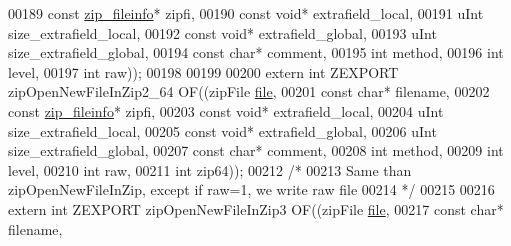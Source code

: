 \begin{DoxyCode}
00189                                             \textcolor{keyword}{const} \hyperlink{structzip__fileinfo}{zip\_fileinfo}* zipfi,
00190                                             \textcolor{keyword}{const} \textcolor{keywordtype}{void}* extrafield\_local,
00191                                             uInt size\_extrafield\_local,
00192                                             \textcolor{keyword}{const} \textcolor{keywordtype}{void}* extrafield\_global,
00193                                             uInt size\_extrafield\_global,
00194                                             \textcolor{keyword}{const} \textcolor{keywordtype}{char}* comment,
00195                                             \textcolor{keywordtype}{int} method,
00196                                             \textcolor{keywordtype}{int} level,
00197                                             \textcolor{keywordtype}{int} raw));
00198 
00199 
00200 \textcolor{keyword}{extern} \textcolor{keywordtype}{int} ZEXPORT zipOpenNewFileInZip2\_64 OF((zipFile \hyperlink{structfile}{file},
00201                                             \textcolor{keyword}{const} \textcolor{keywordtype}{char}* filename,
00202                                             \textcolor{keyword}{const} \hyperlink{structzip__fileinfo}{zip\_fileinfo}* zipfi,
00203                                             \textcolor{keyword}{const} \textcolor{keywordtype}{void}* extrafield\_local,
00204                                             uInt size\_extrafield\_local,
00205                                             \textcolor{keyword}{const} \textcolor{keywordtype}{void}* extrafield\_global,
00206                                             uInt size\_extrafield\_global,
00207                                             \textcolor{keyword}{const} \textcolor{keywordtype}{char}* comment,
00208                                             \textcolor{keywordtype}{int} method,
00209                                             \textcolor{keywordtype}{int} level,
00210                                             \textcolor{keywordtype}{int} raw,
00211                                             \textcolor{keywordtype}{int} zip64));
00212 \textcolor{comment}{/*}
00213 \textcolor{comment}{  Same than zipOpenNewFileInZip, except if raw=1, we write raw file}
00214 \textcolor{comment}{ */}
00215 
00216 \textcolor{keyword}{extern} \textcolor{keywordtype}{int} ZEXPORT zipOpenNewFileInZip3 OF((zipFile \hyperlink{structfile}{file},
00217                                             \textcolor{keyword}{const} \textcolor{keywordtype}{char}* filename,

\end{DoxyCode}
